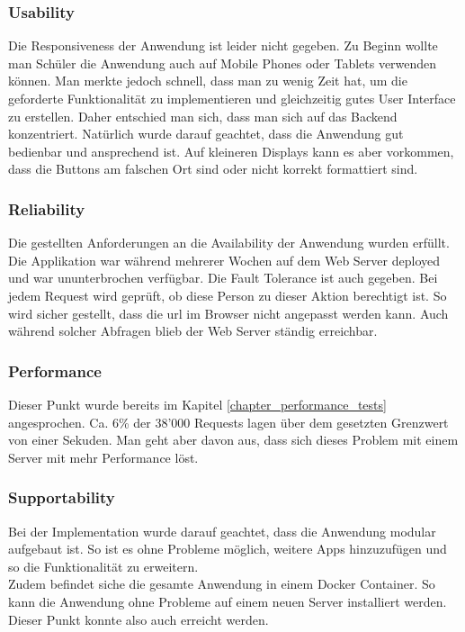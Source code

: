\subsubsection*{Usability}
Die Responsiveness der Anwendung ist leider nicht gegeben. Zu Beginn wollte man Schüler die Anwendung auch auf Mobile Phones oder Tablets verwenden können. Man merkte jedoch schnell, dass man zu wenig Zeit hat, um die geforderte Funktionalität zu implementieren und gleichzeitig gutes User Interface zu erstellen. Daher entschied man sich, dass man sich auf das Backend konzentriert. Natürlich wurde darauf geachtet, dass die Anwendung gut bedienbar und ansprechend ist. Auf kleineren Displays kann es aber vorkommen, dass die Buttons am falschen Ort sind oder nicht korrekt formattiert sind.

\subsubsection*{Reliability}
Die gestellten Anforderungen an die Availability der Anwendung wurden erfüllt. Die Applikation war während mehrerer Wochen auf dem Web Server deployed und war ununterbrochen verfügbar. Die Fault Tolerance ist auch gegeben. Bei jedem Request wird geprüft, ob diese Person zu dieser Aktion berechtigt ist. So wird sicher gestellt, dass die \gls{url} im Browser nicht angepasst werden kann. Auch während solcher Abfragen blieb der Web Server ständig erreichbar.


\subsubsection*{Performance}
Dieser Punkt wurde bereits im Kapitel \ref{chapter_performance_tests} angesprochen. Ca. 6\% der 38'000 Requests lagen über dem gesetzten Grenzwert von einer Sekuden. Man geht aber davon aus, dass sich dieses Problem mit einem Server mit mehr Performance löst.

\subsubsection*{Supportability}
Bei der Implementation wurde darauf geachtet, dass die Anwendung modular aufgebaut ist. So ist es ohne Probleme möglich, weitere Apps hinzuzufügen und so die Funktionalität zu erweitern.\\

Zudem befindet siche die gesamte Anwendung in einem Docker Container. So kann die Anwendung ohne Probleme auf einem neuen Server installiert werden. Dieser Punkt konnte also auch erreicht werden.












\newpage
